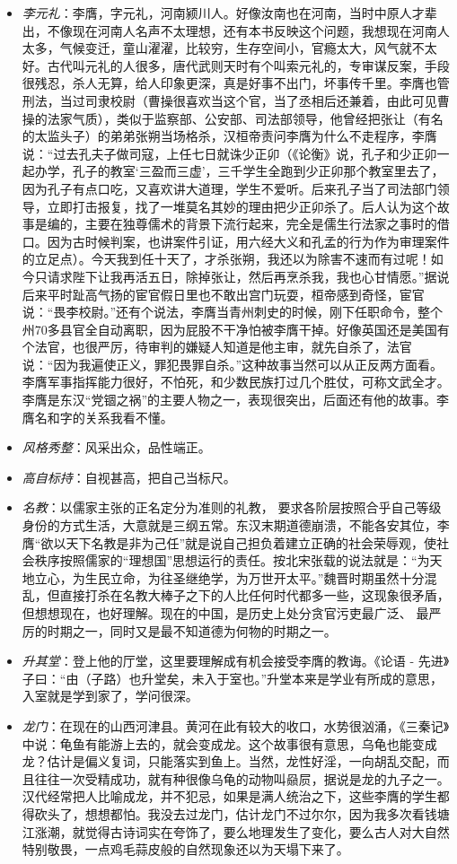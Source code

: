 \documentclass[]{book}
\providecommand{\tightlist}{%
  \setlength{\itemsep}{0pt}\setlength{\parskip}{0pt}}
\begin{document}
\begin{itemize}
\tightlist
\item
  \emph{李元礼}：李膺，字元礼，河南颍川人。好像汝南也在河南，当时中原人才辈出，不像现在河南人名声不太理想，还有本书反映这个问题，我想现在河南人太多，气候变迁，童山濯濯，比较穷，生存空间小，官瘾太大，风气就不太好。古代叫元礼的人很多，唐代武则天时有个叫索元礼的，专审谋反案，手段很残忍，杀人无算，给人印象更深，真是好事不出门，坏事传千里。李膺也管刑法，当过司隶校尉（曹操很喜欢当这个官，当了丞相后还兼着，由此可见曹操的法家气质），类似于监察部、公安部、司法部领导，他曾经把张让（有名的太监头子）的弟弟张朔当场格杀，汉桓帝责问李膺为什么不走程序，李膺说：``过去孔夫子做司寇，上任七日就诛少正卯（《论衡》说，孔子和少正卯一起办学，孔子的教室`三盈而三虚'，三千学生全跑到少正卯那个教室里去了，因为孔子有点口吃，又喜欢讲大道理，学生不爱听。后来孔子当了司法部门领导，立即打击报复，找了一堆莫名其妙的理由把少正卯杀了。后人认为这个故事是编的，主要在独尊儒术的背景下流行起来，完全是儒生行法家之事时的借口。因为古时候判案，也讲案件引证，用六经大义和孔孟的行为作为审理案件的立足点）。今天我到任十天了，才杀张朔，我还以为除害不速而有过呢！如今只请求陛下让我再活五日，除掉张让，然后再烹杀我，我也心甘情愿。''据说后来平时趾高气扬的宦官假日里也不敢出宫门玩耍，桓帝感到奇怪，宦官说：``畏李校尉。''还有个说法，李膺当青州刺史的时候，刚下任职命令，整个州70多县官全自动离职，因为屁股不干净怕被李膺干掉。好像英国还是美国有个法官，也很严厉，待审判的嫌疑人知道是他主审，就先自杀了，法官说：``因为我遍使正义，罪犯畏罪自杀。''这种故事当然可以从正反两方面看。李膺军事指挥能力很好，不怕死，和少数民族打过几个胜仗，可称文武全才。李膺是东汉``党锢之祸''的主要人物之一，表现很突出，后面还有他的故事。李膺名和字的关系我看不懂。
\item
  \emph{风格秀整}：风采出众，品性端正。
\item
  \emph{高自标持}：自视甚高，把自己当标尺。
\item
  \emph{名教}：以儒家主张的正名定分为准则的礼教，
  要求各阶层按照合乎自己等级身份的方式生活，大意就是三纲五常。东汉末期道德崩溃，不能各安其位，李膺``欲以天下名教是非为己任''就是说自己担负着建立正确的社会荣辱观，使社会秩序按照儒家的``理想国''思想运行的责任。按北宋张载的说法就是：``为天地立心，为生民立命，为往圣继绝学，为万世开太平。''魏晋时期虽然十分混乱，但直接打杀在名教大棒子之下的人比任何时代都多一些，这现象很矛盾，但想想现在，也好理解。现在的中国，是历史上处分贪官污吏最广泛、
  最严厉的时期之一，同时又是最不知道德为何物的时期之一。
\item
  \emph{升其堂}：登上他的厅堂，这里要理解成有机会接受李膺的教诲。《论语
  -
  先进》子曰：``由（子路）也升堂矣，未入于室也。''升堂本来是学业有所成的意思，入室就是学到家了，学问很深。
\item
  \emph{龙门}：在现在的山西河津县。黄河在此有较大的收口，水势很汹涌，《三秦记》中说：龟鱼有能游上去的，就会变成龙。这个故事很有意思，乌龟也能变成龙？估计是偏义复词，只能落实到鱼上。当然，龙性好淫，一向胡乱交配，而且往往一次受精成功，就有种很像乌龟的动物叫赑屃，据说是龙的九子之一。汉代经常把人比喻成龙，并不犯忌，如果是满人统治之下，这些李膺的学生都得砍头了，想想都怕。我没去过龙门，估计龙门不过尔尔，因为我多次看钱塘江涨潮，就觉得古诗词实在夸饰了，要么地理发生了变化，要么古人对大自然特别敬畏，一点鸡毛蒜皮般的自然现象还以为天塌下来了。
\end{itemize}
\end{document}

